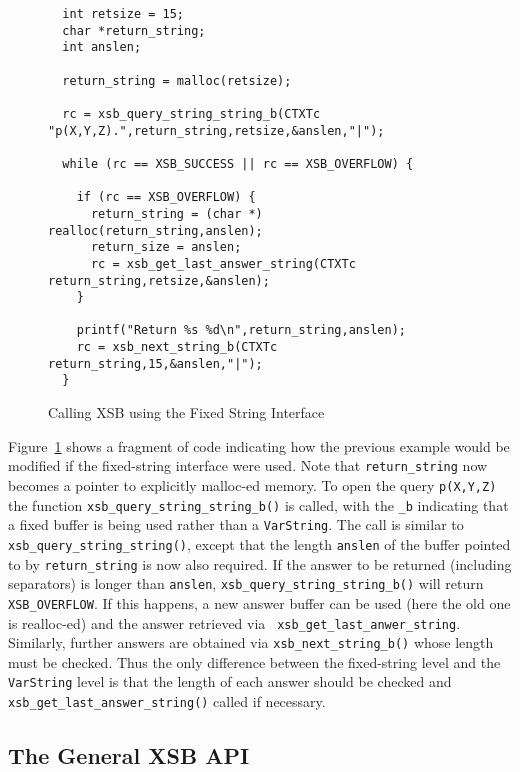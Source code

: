 \begin{figure}[hbtp]
\begin{small}
\begin{verbatim}
  int retsize = 15;
  char *return_string;
  int anslen;

  return_string = malloc(retsize);

  rc = xsb_query_string_string_b(CTXTc "p(X,Y,Z).",return_string,retsize,&anslen,"|");

  while (rc == XSB_SUCCESS || rc == XSB_OVERFLOW) {
  
    if (rc == XSB_OVERFLOW) {
      return_string = (char *) realloc(return_string,anslen);
      return_size = anslen;
      rc = xsb_get_last_answer_string(CTXTc return_string,retsize,&anslen);
    }    

    printf("Return %s %d\n",return_string,anslen);
    rc = xsb_next_string_b(CTXTc return_string,15,&anslen,"|");
  }
\end{verbatim}
\end{small}
\caption{Calling XSB using the Fixed String Interface} \label{fig:fixedstringex}
\end{figure}

Figure~\ref{fig:fixedstringex} shows a fragment of code indicating how
the previous example would be modified if the fixed-string interface
were used.  Note that {\tt return\_string} now becomes a pointer to
explicitly malloc-ed memory.  To open the query {\tt p(X,Y,Z)} the
function {\tt xsb\_query\_string\_string\_b()} is called, with the
{\tt \_b} indicating that a fixed buffer is being used rather than a
{\tt VarString}.  The call is similar to {\tt
  xsb\_query\_string\_string()}, except that the length {\tt anslen}
of the buffer pointed to by {\tt return\_string} is now also required.
If the answer to be returned (including separators) is longer than
{\tt anslen}, {\tt xsb\_query\_string\_string\_b()} will return {\tt
  XSB\_OVERFLOW}.  If this happens, a new answer buffer can be used
(here the old one is realloc-ed) and the answer retrieved via {\tt
  xsb\_get\_last\_anwer\_string}.  Similarly, further answers are
obtained via {\tt xsb\_next\_string\_b()} whose length must be
checked.  Thus the only difference between the fixed-string level and
the {\tt VarString} level is that the length of each answer should be
checked and {\tt xsb\_get\_last\_answer\_string()} called if
necessary.

\subsection{The General XSB API} \label{sec:CXSB}

